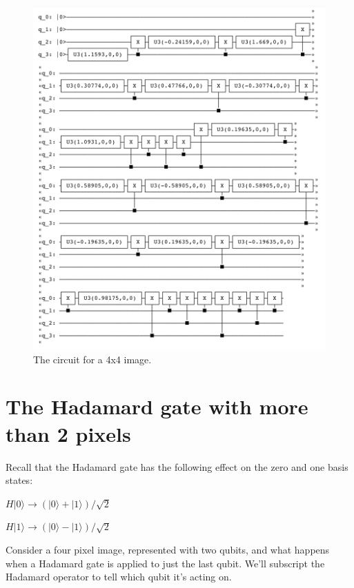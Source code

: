 \documentclass[11pt]{article}
\makeatletter
\def\maxwidth{\ifdim\Gin@nat@width>\linewidth\linewidth
    \else\Gin@nat@width\fi}
\let\Oldincludegraphics\includegraphics
\renewcommand{\includegraphics}[1]{\Oldincludegraphics[width=.8\maxwidth]{#1}}
\makeatother
\begin{document}
    \begin{figure}
\centering
\includegraphics{../img/circ.png}
\caption{The circuit for a 4x4 image.}
\end{figure}

    \hypertarget{the-hadamard-gate-with-more-than-2-pixels}{%
\section{The Hadamard gate with more than 2
pixels}\label{the-hadamard-gate-with-more-than-2-pixels}}

    Recall that the Hadamard gate has the following effect on the zero and
one basis states:

\(H|0\rangle \rightarrow (|0\rangle + |1\rangle)/\sqrt{2}\)

\(H|1\rangle \rightarrow (|0\rangle - |1\rangle)/\sqrt{2}\)

Consider a four pixel image, represented with two qubits, and what
happens when a Hadamard gate is applied to just the last qubit. We'll
subscript the Hadamard operator to tell which qubit it's acting on.
\end{document}

